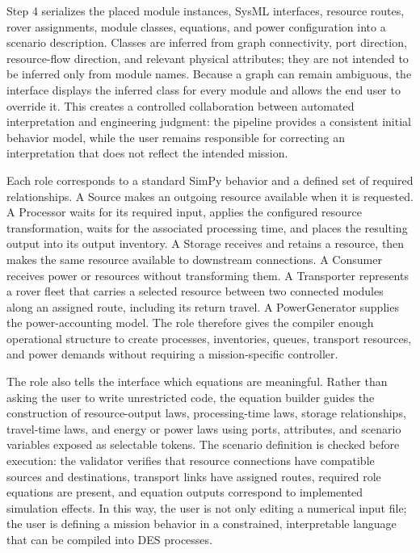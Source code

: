 Step 4 serializes the placed module instances, SysML interfaces, resource routes, rover assignments, module classes, equations, and power configuration into a scenario description. Classes are inferred from graph connectivity, port direction, resource-flow direction, and relevant physical attributes; they are not intended to be inferred only from module names. Because a graph can remain ambiguous, the interface displays the inferred class for every module and allows the end user to override it. This creates a controlled collaboration between automated interpretation and engineering judgment: the pipeline provides a consistent initial behavior model, while the user remains responsible for correcting an interpretation that does not reflect the intended mission.

Each role corresponds to a standard SimPy behavior and a defined set of required relationships. A Source makes an outgoing resource available when it is requested. A Processor waits for its required input, applies the configured resource transformation, waits for the associated processing time, and places the resulting output into its output inventory. A Storage receives and retains a resource, then makes the same resource available to downstream connections. A Consumer receives power or resources without transforming them. A Transporter represents a rover fleet that carries a selected resource between two connected modules along an assigned route, including its return travel. A PowerGenerator supplies the power-accounting model. The role therefore gives the compiler enough operational structure to create processes, inventories, queues, transport resources, and power demands without requiring a mission-specific controller.

The role also tells the interface which equations are meaningful. Rather than asking the user to write unrestricted code, the equation builder guides the construction of resource-output laws, processing-time laws, storage relationships, travel-time laws, and energy or power laws using ports, attributes, and scenario variables exposed as selectable tokens. The scenario definition is checked before execution: the validator verifies that resource connections have compatible sources and destinations, transport links have assigned routes, required role equations are present, and equation outputs correspond to implemented simulation effects. In this way, the user is not only editing a numerical input file; the user is defining a mission behavior in a constrained, interpretable language that can be compiled into DES processes.

